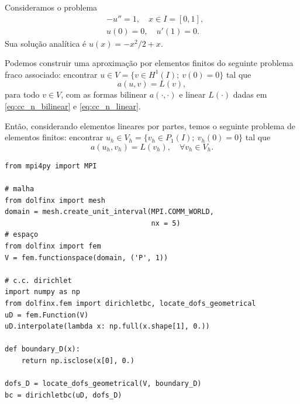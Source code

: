 \begin{ex}\label{ex:cc_n}
  Consideramos o problema
  \begin{align}
    &-u'' = 1,\quad x\in I=[0,1],\label{eq:ex_cc_n_eq}\\
    &u(0) = 0,\quad u'(1) = 0.\label{eq:ex_cc_n_bc}
  \end{align}
Sua solução analítica é $u(x) = -x^2/2+x$. 

Podemos construir uma aproximação por elementos finitos do seguinte problema fraco associado: encontrar $u\in V=\{v\in H^1(I);~v(0)=0\}$ tal que
\begin{equation}
  a(u, v) = L(v),
\end{equation}
para todo $v\in V$, com as formas bilinear $a(\cdot, \cdot)$ e linear $L(\cdot)$ dadas em \eqref{eq:cc_n_bilinear} e \eqref{eq:cc_n_linear}.

Então, considerando elementos lineares por partes, temos o seguinte problema de elementos finitos: encontrar $u_h\in V_h=\{v_h\in P_1(I);~v_h(0)=0\}$ tal que
\begin{equation}
  a(u_h, v_h) = L(v_h),\quad\forall v_h\in V_h.
\end{equation}



\begin{lstlisting}[caption=ex\_mef1d\_neumann.py]
from mpi4py import MPI

# malha
from dolfinx import mesh
domain = mesh.create_unit_interval(MPI.COMM_WORLD,
                                   nx = 5)
# espaço
from dolfinx import fem
V = fem.functionspace(domain, ('P', 1))

# c.c. dirichlet
import numpy as np
from dolfinx.fem import dirichletbc, locate_dofs_geometrical
uD = fem.Function(V)
uD.interpolate(lambda x: np.full(x.shape[1], 0.))

def boundary_D(x):
    return np.isclose(x[0], 0.)

dofs_D = locate_dofs_geometrical(V, boundary_D)
bc = dirichletbc(uD, dofs_D)


\end{lstlisting}
\end{ex}
